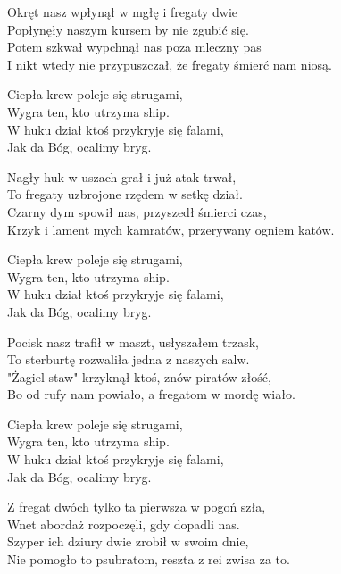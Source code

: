 \begin{text}
   
    Okręt nasz wpłynął w mgłę i fregaty dwie\\
    Popłynęły naszym kursem by nie zgubić się.\\
    Potem szkwał wypchnął nas poza mleczny pas\\
    I nikt wtedy nie przypuszczał, że fregaty śmierć nam niosą.

    \vin Ciepła krew poleje się strugami,\\
    \vin Wygra ten, kto utrzyma ship.\\
    \vin W huku dział ktoś przykryje się falami,\\
    \vin Jak da Bóg, ocalimy bryg.

    Nagły huk w uszach grał i już atak trwał,\\
    To fregaty uzbrojone rzędem w setkę dział.\\
    Czarny dym spowił nas, przyszedł śmierci czas,\\
    Krzyk i lament mych kamratów, przerywany ogniem katów.

    \vin Ciepła krew poleje się strugami,\\
    \vin Wygra ten, kto utrzyma ship.\\
    \vin W huku dział ktoś przykryje się falami,\\
    \vin Jak da Bóg, ocalimy bryg.

    Pocisk nasz trafił w maszt, usłyszałem trzask,\\
    To sterburtę rozwaliła jedna z naszych salw.\\
    "Żagiel staw" krzyknął ktoś, znów piratów złość,\\
    Bo od rufy nam powiało, a fregatom w mordę wiało.

    \vin Ciepła krew poleje się strugami,\\
    \vin Wygra ten, kto utrzyma ship.\\
    \vin W huku dział ktoś przykryje się falami,\\
    \vin Jak da Bóg, ocalimy bryg.

    Z fregat dwóch tylko ta pierwsza w pogoń szła,\\
    Wnet abordaż rozpoczęli, gdy dopadli nas.\\
    Szyper ich dziury dwie zrobił w swoim dnie,\\
    Nie pomogło to psubratom, reszta z rei zwisa za to.


\end{text}
